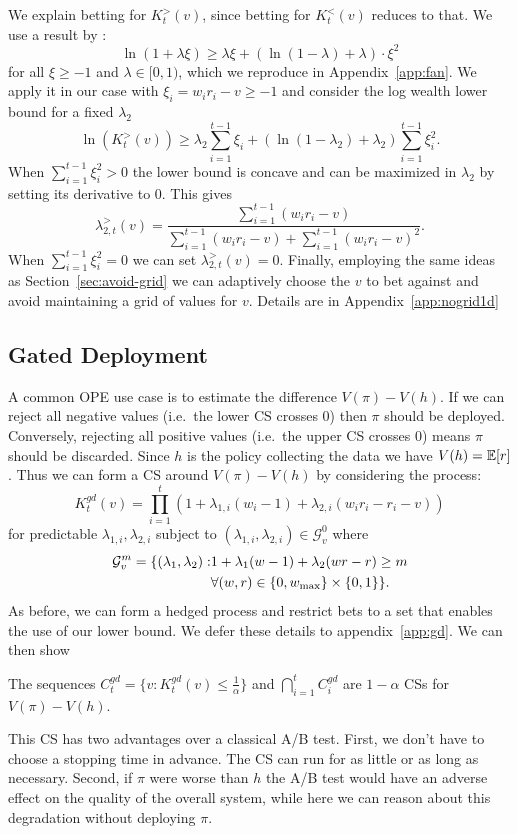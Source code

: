 We explain betting for $K_t^{>}(v)$, since betting for $K_t^{<}(v)$ reduces to
that.  We use a result by \citet{fan2015exponential}:
\[
\ln(1+\lambda \xi) \geq \lambda \xi+\left(\ln\left(1-\lambda\right)+\lambda\right)\cdot \xi^{2}
\]
for all $\xi\geq -1$ and $\lambda \in [0,1)$, which we reproduce in
Appendix~\ref{app:fan}.  We apply it in our case with $\xi_i=w_ir_i-v\geq -1$
and consider the log wealth lower bound for a fixed $\lambda_2$
\[
\ln(K_t^{>}(v)) \geq \lambda_2 \sum_{i=1}^{t-1} \xi_i + \left(\ln\left(1-\lambda_2\right)+\lambda_2\right) \sum_{i=1}^{t-1} \xi_i^2.
\]
When $\sum_{i=1}^{t-1} \xi_i^2>0$ the lower bound is concave and can 
be maximized in $\lambda_2$ by setting its derivative to 0. This gives
\[
\lambda_{2,t}^{>}(v) = \frac{\sum_{i=1}^{t-1} (w_i r_i -v)}{\sum_{i=1}^{t-1} (w_i r_i -v)+\sum_{i=1}^{t-1} (w_i r_i -v)^2}.
\]
When $\sum_{i=1}^{t-1} \xi_i^2=0$ we can set $\lambda_{2,t}^{>}(v)=0$.
Finally, employing the same ideas as Section~\ref{sec:avoid-grid} we can
adaptively choose the $v$ to bet against and avoid maintaining a grid of values
for $v$. Details are in Appendix~\ref{app:nogrid1d}



\subsection{Gated Deployment}
A common OPE use case is to estimate the difference $V(\pi) - V(h)$. If we
can reject all negative values (i.e.\ the lower CS crosses 0) then $\pi$ should be deployed. Conversely,
rejecting all positive values (i.e.\ the upper CS crosses 0) means $\pi$ should be discarded. Since $h$ is the policy collecting the data we have $V(h)=\mathbb{E}[r]$. Thus we can form a CS 
around $V(\pi) - V(h)$ by considering the process:
\[
K_t^{gd}(v) = \prod_{i=1}^t \left(1+\lambda_{1,i} (w_i-1) + \lambda_{2,i}(w_ir_i -r_i -v)\right)  
\]
for predictable $\lambda_{1,i},\lambda_{2,i}$ subject to $(\lambda_{1,i},\lambda_{2,i}) \in \mathcal{G}_{v}^0$
where
\begin{align}
\mathcal{G}_{v}^m = \{(\lambda_{1},\lambda_{2}): & 1+\lambda_1(w-1)+\lambda_2(wr-r)\geq m \notag\\
                         & \forall (w,r) \in \{0,w_{\max}\}\times \{0,1\}
\}.
\end{align}
As before, we can form a hedged process and restrict bets to a set that
enables the use of our lower bound. We defer these details to 
appendix~\ref{app:gd}. We can then show
\begin{theorem}
\label{thm:gated}
The sequences $C_t^{gd} = \{v:K_t^{gd}(v)\leq \frac{1}{\alpha}\}$ and $\bigcap_{i=1}^t C_i^{gd}$
are $1-\alpha$ CSs for $V(\pi)-V(h)$.
\end{theorem}
This CS has two advantages 
over a classical A/B test. First, we don't have to 
choose a stopping time in advance. The CS can run for
as little or as long as necessary. Second, if $\pi$ were
worse than $h$ the A/B test would have an adverse effect
on the quality of the overall system, while here we can
reason about this degradation without deploying $\pi$.

